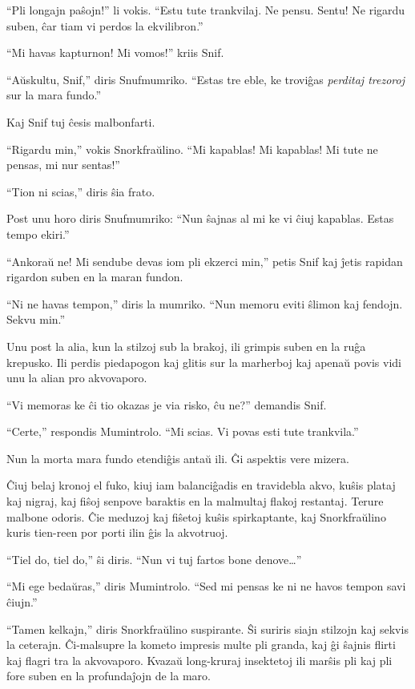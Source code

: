 ``Pli longajn paŝojn!'' li vokis. ``Estu tute trankvilaj. Ne pensu. Sentu! Ne rigardu suben, ĉar tiam vi perdos la ekvilibron.''

``Mi havas kapturnon! Mi vomos!'' kriis Snif.

``Aŭskultu, Snif,'' diris Snufmumriko. ``Estas tre eble, ke troviĝas \emph{perditaj trezoroj} sur la mara fundo.''

Kaj Snif tuj ĉesis malbonfarti.

``Rigardu min,'' vokis Snorkfraŭlino. ``Mi kapablas! Mi kapablas! Mi tute ne pensas, mi nur sentas!''

``Tion ni scias,'' diris ŝia frato.

Post unu horo diris Snufmumriko: ``Nun ŝajnas al mi ke vi ĉiuj kapablas. Estas tempo ekiri.''

``Ankoraŭ ne! Mi sendube devas iom pli ekzerci min,'' petis Snif kaj ĵetis rapidan rigardon suben en la maran fundon.

``Ni ne havas tempon,'' diris la mumriko. ``Nun memoru eviti ŝlimon kaj fendojn. Sekvu min.''

Unu post la alia, kun la stilzoj sub la brakoj, ili grimpis suben en la ruĝa krepusko. Ili perdis piedapogon kaj glitis sur la marherboj kaj apenaŭ povis vidi unu la alian pro akvovaporo.

``Vi memoras ke ĉi tio okazas je via risko, ĉu ne?'' demandis Snif.

``Certe,'' respondis Mumintrolo. ``Mi scias. Vi povas esti tute trankvila.''

Nun la morta mara fundo etendiĝis antaŭ ili. Ĝi aspektis vere mizera.

Ĉiuj belaj kronoj el fuko, kiuj iam balanciĝadis en travidebla akvo, kuŝis plataj kaj nigraj, kaj fiŝoj senpove baraktis en la malmultaj flakoj restantaj. Terure malbone odoris. Ĉie meduzoj kaj fiŝetoj kuŝis spirkaptante, kaj Snorkfraŭlino kuris tien-reen por porti ilin ĝis la akvotruoj.

``Tiel do, tiel do,'' ŝi diris. ``Nun vi tuj fartos bone denove{\ldots}''

``Mi ege bedaŭras,'' diris Mumintrolo. ``Sed mi pensas ke ni ne havos tempon savi ĉiujn.''

``Tamen kelkajn,'' diris Snorkfraŭlino suspirante. Ŝi suriris siajn stilzojn kaj sekvis la ceterajn. Ĉi-malsupre la kometo impresis multe pli granda, kaj ĝi ŝajnis flirti kaj flagri tra la akvovaporo. Kvazaŭ long-kruraj insektetoj ili marŝis pli kaj pli fore suben en la profundaĵojn de la maro.

